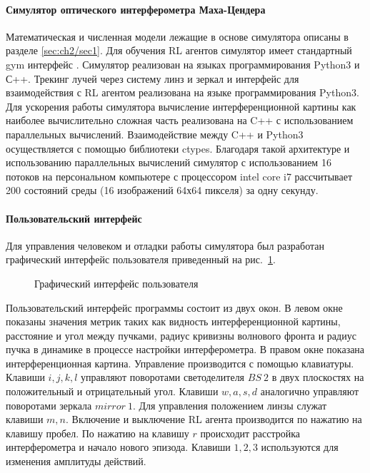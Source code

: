 \paragraph{Симулятор оптического интерферометра Маха-Цендера}
Математическая и численная модели лежащие в основе симулятора описаны в разделе \ref{sec:ch2/sec1}. Для обучения RL агентов симулятор имеет стандартный gym интерфейс \cite{brockman2016openai}. Симулятор реализован на языках программирования Python3 и С++. Трекинг лучей через систему линз и зеркал и интерфейс для взаимодействия с RL агентом реализована на языке программирования Python3. Для ускорения работы симулятора вычисление интерференционной картины как наиболее вычислительно сложная часть реализована на C++ с использованием параллельных вычислений. Взаимодействие между C++ и Python3 осуществляется с помощью библиотеки ctypes. Благодаря такой архитектуре и использованию параллельных вычислений симулятор с использованием 16 потоков на персональном компьютере с процессором intel core i7 рассчитывает 200 состояний среды (16 изображений 64х64 пикселя) за одну секунду. 

\paragraph{Пользовательский интерфейс}

Для управления человеком и отладки работы симулятора был разработан графический интерфейс пользователя приведенный на рис.~\ref{fig:gui}. 

\begin{figure}[ht]
\caption{Графический интерфейс пользователя}
\label{fig:gui}
\end{figure}

Пользовательский интерфейс программы состоит из двух окон. В левом окне показаны значения метрик таких как видность интерференционной картины, расстояние и угол между пучками, радиус кривизны волнового фронта и радиус пучка в динамике в процессе настройки интерферометра. В правом окне показана интерференционная картина. Управление производится с помощью клавиатуры. Клавиши $i,j,k,l$ управляют поворотами светоделителя $BS\ 2$ в двух плоскостях на положительный и отрицательный угол. Клавиши $w,a,s,d$ аналогично управляют поворотами зеркала $mirror\ 1$. Для управления положением линзы служат клавиши $m,n$. Включение и выключение RL агента производится по нажатию на клавишу пробел. По нажатию на клавишу $r$ происходит расстройка интерферометра и начало нового эпизода. Клавиши $1,2,3$ используются для изменения амплитуды действий.

